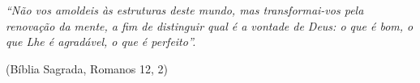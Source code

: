 \begin{epigrafe}
    \vspace*{\fill}
	\begin{flushright}
		\begin{minipage}{.5\textwidth}
			\textit{``Não vos amoldeis às estruturas deste mundo, 
			mas transformai-vos pela renovação da mente, 
			a fim de distinguir qual é a vontade de Deus: 
			o que é bom, o que Lhe é agradável, o que é perfeito''.}
			\begin{flushright}
				(Bíblia Sagrada, Romanos 12, 2)
			\end{flushright}
		\end{minipage}
	\end{flushright}
\end{epigrafe}

